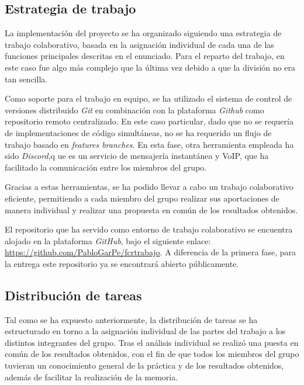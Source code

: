 \documentclass[11pt,a4paper]{article}
\begin{document}
\subsection{Estrategia de trabajo}
La implementación del proyecto se ha organizado siguiendo una estrategia de trabajo colaborativo, basada en la asignación individual de cada una de las funciones principales descritas en el enunciado. Para el reparto del trabajo, en este caso fue algo más complejo que la última vez debido a que la división no era tan sencilla. \vspace{2ex}

\noindent Como soporte para el trabajo en equipo, se ha utilizado el sistema de control de versiones distribuido \textit{Git} en combinación con la plataforma \textit{Github} como repositorio remoto centralizado. En este caso particular, dado que no se requería de implementaciones de código simultáneas, no se ha requerido un flujo de trabajo basado en \textit{features branches}. En esta fase, otra herramienta empleada ha sido \textit{Discord},q ue es un servicio de mensajería instantánea y VoIP, que ha facilitado la comunicación entre los miembros del grupo. \vspace{2ex}

\noindent Gracias a estas herramientas, se ha podido llevar a cabo un trabajo colaborativo eficiente, permitiendo a cada miembro del grupo realizar sus aportaciones de manera individual y realizar una propuesta en común de los resultados obtenidos.

\noindent El repositorio que ha servido como entorno de trabajo colaborativo se encuentra alojado en la plataforma \textit{GitHub}, bajo el siguiente enlace: \href{https://github.com/PabloGarPe/fcrtrabajo}{https://github.com/PabloGarPe/fcrtrabajo}. A diferencia de la primera fase, para la entrega este repositorio ya se encontrará abierto públicamente.\vspace{5ex}

\subsection{Distribución de tareas}
Tal como se ha expuesto anteriormente, la distribución de tareas se ha estructurado en torno a la asignación individual de las partes del trabajo a los distintos integrantes del grupo. Tras el análisis individual se realizó una puesta en común de los resultados obtenidos, con el fin de que todos los miembros del grupo tuvieran un conocimiento general de la práctica y de los resultados obtenidos, además de facilitar la realización de la memoria. \vspace{2ex}
\end{document}
